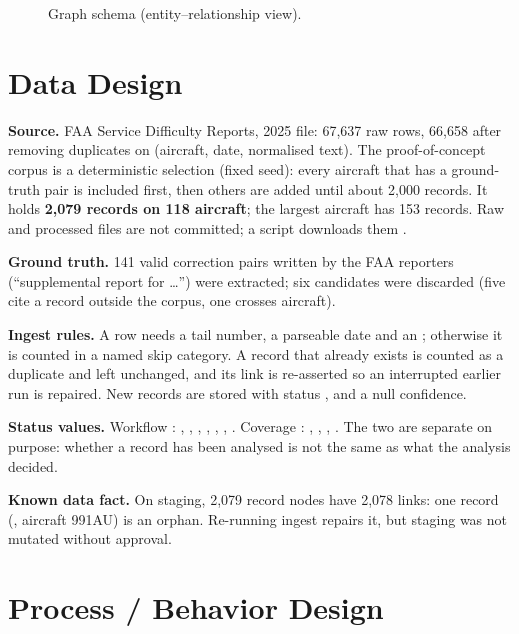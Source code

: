 \begin{figure}[htb]
\centering

\caption{Graph schema (entity--relationship view).}\label{fig:erd}
\end{figure}

\section{Data Design}\label{sec:data}
\textbf{Source.} FAA Service Difficulty Reports, 2025 file: 67,637 raw rows, 66,658 after removing duplicates on (aircraft, date, normalised text). The proof-of-concept corpus is a deterministic selection (fixed seed): every aircraft that has a ground-truth pair is included first, then others are added until about 2,000 records. It holds \textbf{2,079 records on 118 aircraft}; the largest aircraft has 153 records. Raw and processed files are not committed; a script downloads them \citep{faa-sdr}.

\textbf{Ground truth.} 141 valid correction pairs written by the FAA reporters (``supplemental report for \ldots'') were extracted; six candidates were discarded (five cite a record outside the corpus, one crosses aircraft).

\textbf{Ingest rules.} A row needs a tail number, a parseable  date and an ; otherwise it is counted in a named skip category. A record that already exists is counted as a duplicate and left unchanged, and its  link is re-asserted so an interrupted earlier run is repaired. New records are stored with status ,   and a null confidence.

\textbf{Status values.} Workflow : , , , , , , . Coverage : , , , . The two are separate on purpose: whether a record has been analysed is not the same as what the analysis decided.

\textbf{Known data fact.} On staging, 2,079 record nodes have 2,078  links: one record (, aircraft 991AU) is an orphan. Re-running ingest repairs it, but staging was not mutated without approval.

\section{Process / Behavior Design}
